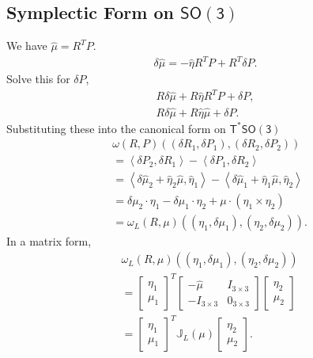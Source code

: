 \documentclass[letterpaper, 10pt, conference]{ieeeconf}
\newcommand{\SO}{\ensuremath{\mathsf{SO(3)}}}
\newcommand{\T}{\ensuremath{\mathsf{T}}}
\newcommand{\pair}[1]{\ensuremath{\left\langle #1 \right\rangle}}
\begin{document}
\subsection{Symplectic Form on $\SO$}

We have $\hat\mu = R^T  P$.
\begin{align*}
\delta \hat \mu = -\hat\eta R^T P + R^T \delta P.
\end{align*}
Solve this for $\delta P$,
\begin{align*}
R \delta \hat \mu + R\hat\eta R^T P + \delta P,\\
R \delta \hat \mu + R\hat\eta \hat\mu+ \delta P.
\end{align*}
Substituting these into the canonical form on $\T^*\SO$
\begin{align*}
    & \omega( R, P) ((\delta R_1, \delta P_1),(\delta R_2, \delta P_2)) \\
    & = \pair{\delta P_2, \delta R_1}-\pair{\delta P_1, \delta R_2} \\
    & = \pair{\delta\hat\mu_2 +\hat\eta_2\hat\mu, \hat\eta_1} 
    -\pair{\delta\hat \mu_1 + \hat\eta_1\hat\mu, \hat \eta_2}\\
    & = \delta \mu_2 \cdot \eta_1 - \delta \mu_1 \cdot \eta_2 + \mu \cdot (\eta_1\times \eta_2)\\
    & = \omega_L(R,\mu) ((\eta_1, \delta \mu_1), (\eta_2,\delta\mu_2)).
\end{align*}
In a matrix form, 
\begin{align*}
    & \omega_L(R,\mu) ((\eta_1, \delta \mu_1), (\eta_2,\delta\mu_2))\\
    & =    \begin{bmatrix} \eta_1 \\ \mu_1 \end{bmatrix}^T
    \begin{bmatrix} -\hat\mu & I_{3\times 3}\\
        -I_{3\times 3} & 0_{3\times 3} 
    \end{bmatrix}
    \begin{bmatrix} \eta_2 \\ \mu_2 \end{bmatrix} \\
    & =    \begin{bmatrix} \eta_1 \\ \mu_1 \end{bmatrix}^T
    \mathbb{J}_L(\mu)
    \begin{bmatrix} \eta_2 \\ \mu_2 \end{bmatrix}.
\end{align*}
\end{document}
